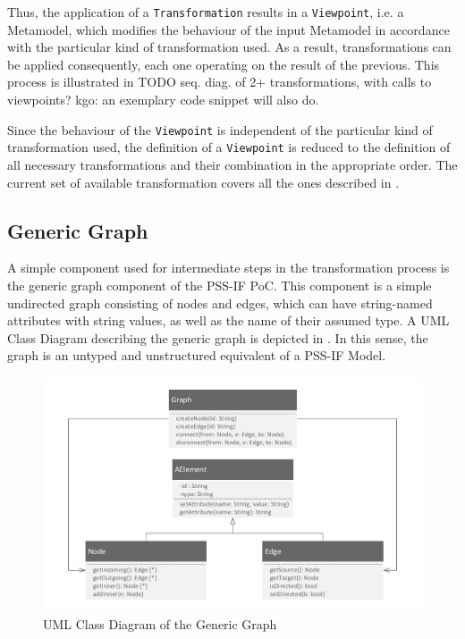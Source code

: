 Thus, the application of a \texttt{Transformation} results in a \texttt{Viewpoint}, i.e. a Metamodel, which modifies the behaviour of the input Metamodel in accordance with the particular kind of transformation used. As a result, transformations can be applied consequently, each one operating on the result of the previous. This process is illustrated in \color{red} TODO seq. diag. of 2+ transformations, with calls to viewpoints? kgo: an exemplary code snippet will also do\color{black}.

Since the behaviour of the \texttt{Viewpoint} is independent of the particular kind of transformation used, the definition of a \texttt{Viewpoint} is reduced to the definition of all necessary transformations and their combination in the appropriate order. The current set of available transformation covers all the ones described in .

\subsection{Generic Graph}

A simple component used for intermediate steps in the transformation process is the generic graph component of the PSS-IF PoC. This component is a simple undirected graph consisting of nodes and edges, which can have string-named attributes with string values, as well as the name of their assumed type. A UML Class Diagram describing the generic graph is depicted in . In this sense, the graph is an untyped and unstructured equivalent of a PSS-IF Model.

\begin{figure}[h]
\centering
\includegraphics[scale=0.75]{figures/graph.pdf}
\caption{UML Class Diagram of the Generic Graph}
\label{fig:genericgraph}
\end{figure}

